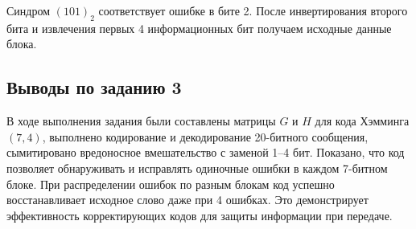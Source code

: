 Синдром $(101)_2$ соответствует ошибке в бите 2. После инвертирования второго бита и извлечения первых 4 информационных бит получаем исходные данные блока.

\subsection{Выводы по заданию 3}
В ходе выполнения задания были составлены матрицы $G$ и $H$ для кода Хэмминга $(7, 4)$, выполнено кодирование и декодирование 20-битного сообщения, сымитировано вредоносное вмешательство с заменой 1--4 бит. Показано, что код позволяет обнаруживать и исправлять одиночные ошибки в каждом 7-битном блоке. При распределении ошибок по разным блокам код успешно восстанавливает исходное слово даже при 4 ошибках. Это демонстрирует эффективность корректирующих кодов для защиты информации при передаче.
